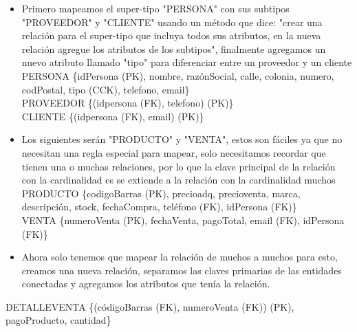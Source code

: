 \documentclass{article}
\begin{document}
\begin{itemize}
\item Primero mapeamos el super-tipo "PERSONA" con sus subtipos "PROVEEDOR" y "CLIENTE" usando un método que dice: "crear una relación para el super-tipo que incluya todos sus atributos, en la nueva relación agregue los atributos de los subtipos", finalmente agregamos un nuevo atributo llamado "tipo" para diferenciar entre un proveedor y un cliente\\

PERSONA \{id\textunderscore Persona (PK), nombre, razón\textunderscore Social, calle, colonia, numero, cod\textunderscore Postal, tipo (CCK), telefono, email\} \\

PROVEEDOR \{(id\textunderscore persona (FK), telefono) (PK)\} \\

CLIENTE \{(id\textunderscore persona (FK), email) (PK)\} \\

\item Los siguientes serán "PRODUCTO" y "VENTA", estos son fáciles ya que no necesitan una regla especial para mapear, solo necesitamos recordar que tienen una o muchas relaciones, por lo que la clave principal de la relación con la cardinalidad es se extiende a la relación con la cardinalidad muchos \\

PRODUCTO \{codigo\textunderscore Barras (PK), precio\textunderscore adq, precio\textunderscore venta, marca, descripción, stock, fecha\textunderscore Compra, teléfono (FK), id\textunderscore Persona (FK)\} \\

VENTA \{numero\textunderscore Venta (PK), fecha\textunderscore Venta, pago\textunderscore Total, email (FK), id\textunderscore Persona (FK)\} \\

\item Ahora solo tenemos que mapear la relación de muchos a muchos para esto, creamos una nueva relación, separamos las claves primarias de las entidades conectadas y agregamos los atributos que tenía la relación. \\
\end{itemize}

DETALLE\textunderscore VENTA \{(código\textunderscore Barras (FK), numero\textunderscore Venta (FK)) (PK), pago\textunderscore Producto, cantidad\} \\
\end{document}
